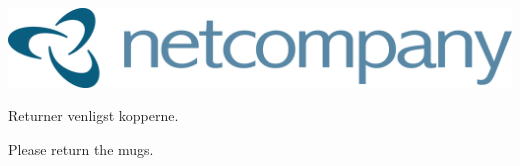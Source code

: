 \documentclass{article}
\begin{document}
\maketitle

\null
\vspace{-1.5cm}


\vspace{0.2in}

\begin{center}

\includegraphics[scale=1.1]{billeder/netcompany-logo.png}

\end{center}

\vspace{0.3in}

\begin{center}

\huge Returner venligst kopperne.

\english

\huge Please return the mugs.

\end{center}

\dansk

\underskriv
\end{document}
